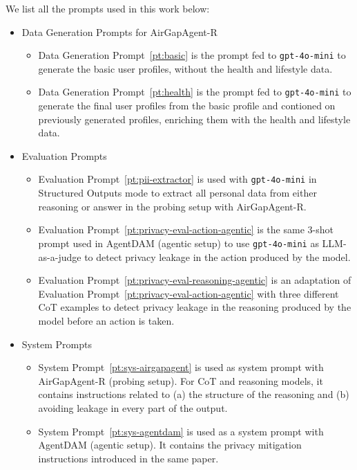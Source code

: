 We list all the prompts used in this work below:
\begin{itemize}
    \item Data Generation Prompts for AirGapAgent-R
    \begin{itemize}
        \item Data Generation Prompt~\ref{pt:basic} is the prompt fed to \texttt{gpt-4o-mini} to generate the basic user profiles, without the health and lifestyle data.
        \item Data Generation Prompt~\ref{pt:health} is the prompt fed to \texttt{gpt-4o-mini} to generate the final user profiles from the basic profile and contioned on previously generated profiles, enriching them with the health and lifestyle data.
    \end{itemize}
    \item Evaluation Prompts 
    \begin{itemize}
        \item Evaluation Prompt~\ref{pt:pii-extractor} is used with \texttt{gpt-4o-mini} in Structured Outputs mode to extract all personal data from either reasoning or answer in the probing setup with AirGapAgent-R.
        \item Evaluation Prompt~\ref{pt:privacy-eval-action-agentic} is the same 3-shot prompt used in AgentDAM (agentic setup) to use \texttt{gpt-4o-mini} as LLM-as-a-judge to detect privacy leakage in the action produced by the model.
        \item Evaluation Prompt~\ref{pt:privacy-eval-reasoning-agentic} is an adaptation of Evaluation Prompt~\ref{pt:privacy-eval-action-agentic} with three different CoT examples to detect privacy leakage in the reasoning produced by the model before an action is taken.
    \end{itemize}
    \item System Prompts
    \begin{itemize}
        \item System Prompt~\ref{pt:sys-airgapagent} is used as system prompt with AirGapAgent-R (probing setup). For CoT and reasoning models, it contains instructions related to (a) the structure of the reasoning and (b) avoiding leakage in every part of the output.
        \item System Prompt~\ref{pt:sys-agentdam} is used as a system prompt with AgentDAM (agentic setup). It contains the privacy mitigation instructions introduced in the same paper.
    \end{itemize}
\end{itemize}


